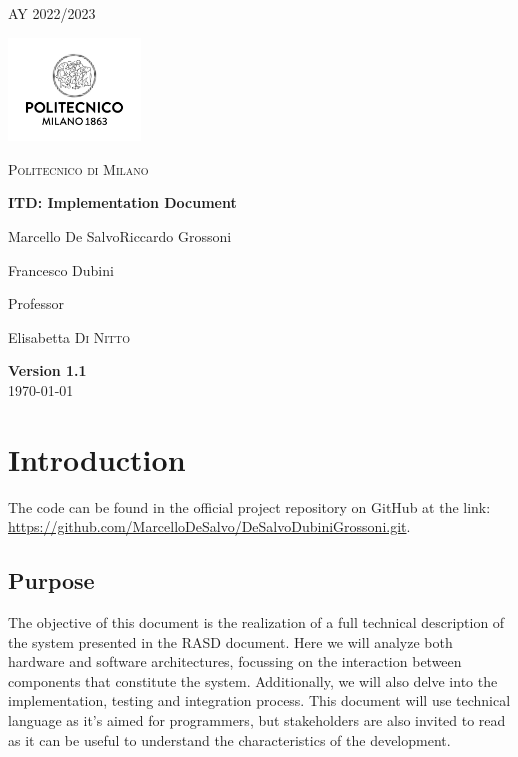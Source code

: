 \documentclass[table, 12pt]{article}
\begin{document}
\begin{titlepage}
    \centering
    {\scshape\large AY 2022/2023 \par}
    \vfill
    \includegraphics[width=100pt]{assets/logo_polimi.jpg}\par\vspace{1cm}
    {\scshape\LARGE Politecnico di Milano \par}
    \vspace{1.5cm}
    {\huge\bfseries ITD\@: Implementation Document \par}
    \vspace{2cm}
    {\Large {Marcello De Salvo\quad Riccardo Grossoni \par Francesco Dubini}\par}
    \vfill
    {\large Professor\par
        Elisabetta \textsc{Di Nitto}}
    \vfill
    {\large \textbf{Version 1.1}\\ \today \par}
\end{titlepage}


\thispagestyle{plain}
\mbox{}
\newpage
{}
\tableofcontents
\newpage
{}

\section{Introduction}
The code can be found in the official project repository on GitHub at the link:
\url{https://github.com/MarcelloDeSalvo/DeSalvoDubiniGrossoni.git}.

\subsection{Purpose}

The objective of this document is the realization of a full technical description of the system presented in the RASD document.
Here we will analyze both hardware and software architectures, focussing on the interaction between components that constitute the system.
Additionally, we will also delve into the implementation, testing and integration process.
This document will use technical language as it's aimed for programmers, but stakeholders are also invited to read as it can be useful to understand the characteristics of the development.
\end{document}
